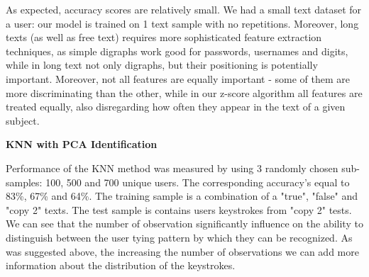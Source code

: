 \documentclass[12pt,a4]{article}
\begin{document}
As expected, accuracy scores are relatively small. We had a small text dataset for a user: our model is trained on 1 text sample with no repetitions. Moreover, long texts (as well as free text) requires more sophisticated feature extraction techniques, as simple digraphs work good for passwords, usernames and digits, while in long text not only digraphs, but their positioning is potentially important. Moreover, not all features are equally important - some of them are more discriminating than the other, while in our z-score algorithm all features are treated equally, also disregarding how often they appear in the text of a given subject.


\medskip
\small\textbf{KNN with PCA Identification}
\medskip

\normalsize

Performance of the KNN method was measured by using 3 randomly chosen sub-samples: 100, 500 and 700 unique users. The corresponding accuracy's equal to 83\%, 67\% and 64\%. The training sample is a combination of a "true", "false" and "copy 2" texts. The test sample is contains users keystrokes from "copy 2" tests. We can see that the number of observation significantly influence on the ability to distinguish between the user tying pattern by which they can be recognized. As was suggested above, the increasing the number of observations we can add more information about the distribution of the keystrokes.

{}

\end{document}
